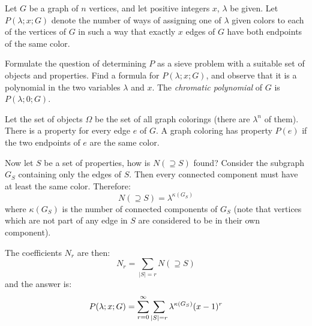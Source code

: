 \begin{exercise}
    Let $G$ be a graph of $n$ vertices, and let positive integers $x$, $\lambda$ be given. Let $P(\lambda;x;G)$ denote the number of ways of assigning one of $\lambda$ given colors to each of the vertices of $G$ in such a way that exactly $x$ edges of $G$ have both endpoints of the same color.

    Formulate the question of determining $P$ as a sieve problem with a suitable set of objects and properties. Find a formula for $P(\lambda;x;G)$, and observe that it is a polynomial in the two variables $\lambda$ and $x$. The \emph{chromatic polynomial} of $G$ is $P(\lambda;0;G)$.
\end{exercise}
\begin{solution}
    Let the set of objects $\Omega$ be the set of all graph colorings (there are $\lambda^n$ of them). There is a property for every edge $e$ of $G$. A graph coloring has property $P(e)$ if the two endpoints of $e$ are the same color.

    Now let $S$ be a set of properties, how is $N(\supseteq S)$ found? Consider the subgraph $G_S$ containing only the edges of $S$. Then every connected component must have at least the same color. Therefore:
    \[
        N(\supseteq S) = \lambda^{\kappa(G_S)}
    \]
    where $\kappa(G_S)$ is the number of connected components of $G_S$ (note that vertices which are not part of any edge in $S$ are considered to be in their own component).

    The coefficients $N_r$ are then:
    \[
        N_r = \sum_{|S| = r} N(\supseteq S)
    \]
    and the answer is:
    \[
        P(\lambda;x;G) = \bsum[r] \sum_{|S| =r} \lambda^{\kappa(G_S)} (x-1)^r
    \]
\end{solution}

